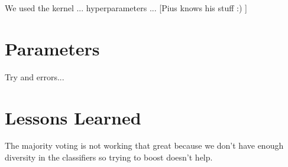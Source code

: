 \documentclass[a4paper, 11pt]{article}
\begin{document}
We used the kernel ... hyperparameters ... [Pius knows his stuff :) ]

\section{Parameters}

Try and errors...

\section{Lessons Learned}

The majority voting is not working that great because we don't have enough diversity in the classifiers so trying to boost doesn't help.
\end{document}
